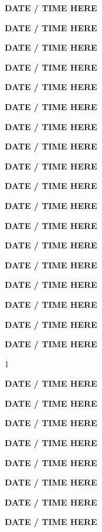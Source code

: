 \documentclass[12pt]{extbook}
\newcommand{\abstract}[2]{{
\begin{center}
\bfseries #1
\end{center}}
\par
}
\begin{document}
\clearpage

\abstract{DATE / TIME HERE}{abstracts/Blanc}
\abstract{DATE / TIME HERE}{abstracts/Brennwald}
\abstract{DATE / TIME HERE}{abstracts/Currle}
\abstract{DATE / TIME HERE}{abstracts/Daskalopoulou}
\abstract{DATE / TIME HERE}{abstracts/Dutoit}
\abstract{DATE / TIME HERE}{abstracts/Engelhardt}
\abstract{DATE / TIME HERE}{abstracts/Finger}
\abstract{DATE / TIME HERE}{abstracts/Giroud}
\abstract{DATE / TIME HERE}{abstracts/GroegerTrampe}
\abstract{DATE / TIME HERE}{abstracts/Iwe}
\abstract{DATE / TIME HERE}{abstracts/Jacops}
\abstract{DATE / TIME HERE}{abstracts/Kimani}
\abstract{DATE / TIME HERE}{abstracts/Kipfer}
\abstract{DATE / TIME HERE}{abstracts/vanLeeuw}
\abstract{DATE / TIME HERE}{abstracts/Lightfoot}
\abstract{DATE / TIME HERE}{abstracts/Marion}
\abstract{DATE / TIME HERE}{abstracts/Mtili}
\abstract{DATE / TIME HERE}{abstracts/Musy}1
\abstract{DATE / TIME HERE}{abstracts/Ortega}
\abstract{DATE / TIME HERE}{abstracts/Picard}
\abstract{DATE / TIME HERE}{abstracts/Roques}
\abstract{DATE / TIME HERE}{abstracts/Slagter}
\abstract{DATE / TIME HERE}{abstracts/Strauch_Zimmer}
\abstract{DATE / TIME HERE}{abstracts/Tomonaga}
\abstract{DATE / TIME HERE}{abstracts/vanRooyen}
\abstract{DATE / TIME HERE}{abstracts/Wang}
\end{document}
